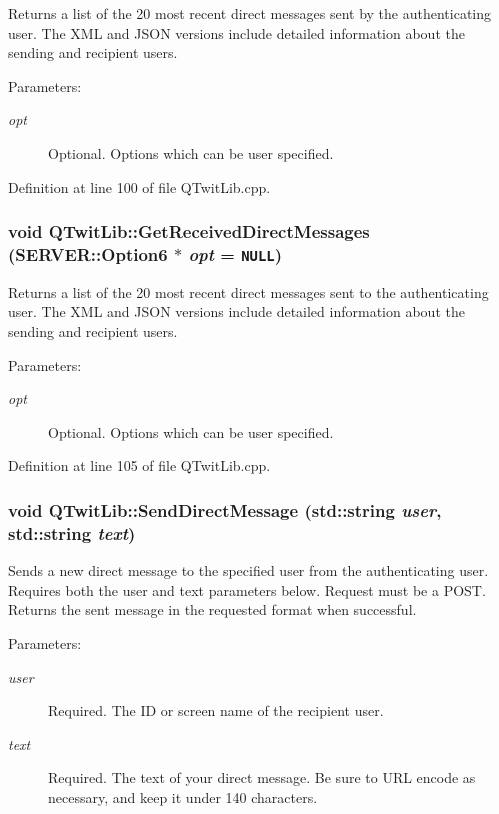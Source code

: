 Returns a list of the 20 most recent direct messages sent by the authenticating user. The XML and JSON versions include detailed information about the sending and recipient users. \begin{Desc}
\item[Parameters:]
\begin{description}
\item[{\em opt}]Optional. Options which can be user specified. \end{description}
\end{Desc}


Definition at line 100 of file QTwitLib.cpp.\hypertarget{classQTwitLib_e74e86c34e908189d4ae40359daa48e2}{
\subsubsection{\setlength{\rightskip}{0pt plus 5cm}void QTwitLib::GetReceivedDirectMessages ({\bf SERVER::Option6} $\ast$ {\em opt} = {\tt NULL})}}
\label{classQTwitLib_e74e86c34e908189d4ae40359daa48e2}


Returns a list of the 20 most recent direct messages sent to the authenticating user. The XML and JSON versions include detailed information about the sending and recipient users. \begin{Desc}
\item[Parameters:]
\begin{description}
\item[{\em opt}]Optional. Options which can be user specified. \end{description}
\end{Desc}


Definition at line 105 of file QTwitLib.cpp.\hypertarget{classQTwitLib_da8e53e355f2c5f13affe2d59e4e9279}{
\subsubsection{\setlength{\rightskip}{0pt plus 5cm}void QTwitLib::SendDirectMessage (std::string {\em user}, \/  std::string {\em text})}}
\label{classQTwitLib_da8e53e355f2c5f13affe2d59e4e9279}


Sends a new direct message to the specified user from the authenticating user. Requires both the user and text parameters below. Request must be a POST. Returns the sent message in the requested format when successful. \begin{Desc}
\item[Parameters:]
\begin{description}
\item[{\em user}]Required. The ID or screen name of the recipient user. \item[{\em text}]Required. The text of your direct message. Be sure to URL encode as necessary, and keep it under 140 characters. \end{description}
\end{Desc}


